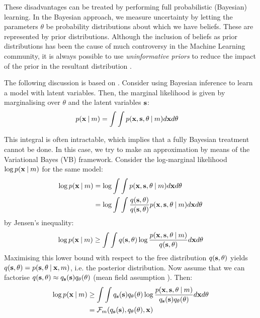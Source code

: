 \documentclass[../main.tex]{subfiles}
\begin{document}
\par These disadvantages can be treated by performing full probabilistic (Bayesian) learning. In the Bayesian approach, we measure uncertainty by letting the parameters $\theta$ be probability distributions about which we have beliefs. These are represented by prior distributions. Although the inclusion of beliefs as prior distributions has been the cause of much controversy in the Machine Learning community, it is always possible to use \emph{uninformative priors} to reduce the impact of the prior in the resultant distribution \cite{Bishop2006}. 
\par The following discussion is based on \cite{Ghahramani2001,Beal2003}. Consider using Bayesian inference to learn a model with latent variables. Then, the marginal likelihood is given by marginalising over $\theta$ and the latent variables $\mathbf{s}$:
\begin{align*}
p(\mathbf{x} \:\vert\: m) &= \int\int p(\mathbf{x}, \mathbf{s}, \theta \:\vert\: m) d\mathbf{x} d\theta
\end{align*}
\par This integral is often intractable, which implies that a fully Bayesian treatment cannot be done. In this case, we try to make an approximation by means of the Variational Bayes (VB) framework. Consider the log-marginal likelihood $\log{p(\mathbf{x} \:\vert\: m)}$ for the same model:
\begin{align*}\label{eq:marginal}
\log{p(\mathbf{x} \:\vert\: m)} &= \log{\int\int p(\mathbf{x}, \mathbf{s}, \theta \:\vert\: m) d\mathbf{x} d\theta}\\
&= \log{\int\int \frac{q(\mathbf{s}, \theta)}{q(\mathbf{s}, \theta)}p(\mathbf{x}, \mathbf{s}, \theta \:\vert\: m) d\mathbf{x} d\theta}
\end{align*}
by Jensen's inequality:
\begin{equation*}\label{eq:jensen}
\log{p(\mathbf{x} \:\vert\: m)} \geq  \int\int q(\mathbf{s}, \theta)\log{\frac{p(\mathbf{x}, \mathbf{s}, \theta \:\vert\: m)}{q(\mathbf{s}, \theta)}} d\mathbf{x} d\theta
\end{equation*}
Maximising this lower bound with respect to the free distribution $q(\mathbf{s}, \theta)$ yields $q(\mathbf{s}, \theta) = p(\mathbf{s}, \theta \:\vert\: \mathbf{x}, m)$, i.e. the posterior distribution. Now assume that we can factorise $q(\mathbf{s}, \theta) \approx q_{\mathbf{s}}(\mathbf{s})q_{\theta}(\theta)$ (mean field assumption \cite{Rezek2005}). Then:
\begin{align*}
\log{p(\mathbf{x} \:\vert\: m)} &\geq  \int\int q_{\mathbf{s}}(\mathbf{s})q_{\theta}(\theta)\log{\frac{p(\mathbf{x}, \mathbf{s}, \theta \:\vert\: m)}{q_{\mathbf{s}}(\mathbf{s})q_{\theta}(\theta)}} d\mathbf{x} d\theta \\
 &= \mathcal{F}_m(q_{\mathbf{s}}(\mathbf{s}), q_{\theta}(\theta), \mathbf{x})
\end{align*}
\end{document}
